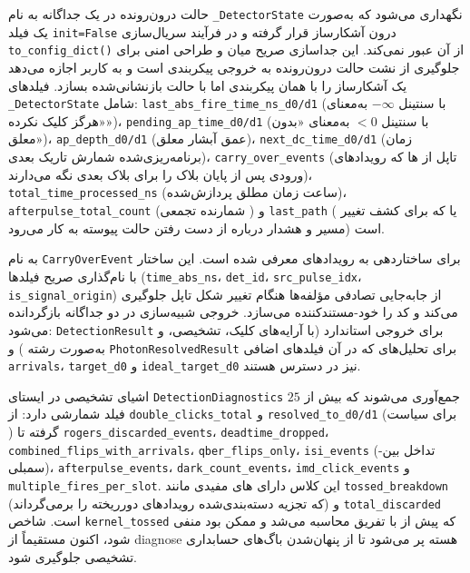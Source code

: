 حالت درون‌رونده در یک  جداگانه به نام \texttt{\_DetectorState} نگهداری می‌شود که به‌صورت یک فیلد \texttt{init=False} درون آشکارساز قرار گرفته و در فرآیند سریال‌سازی \texttt{to\_config\_dict()} از آن عبور نمی‌کند. این جداسازی صریح میان  و  طراحی امنی برای جلوگیری از نشت حالت درون‌رونده به خروجی پیکربندی است و به کاربر اجازه می‌دهد یک آشکارساز را با همان پیکربندی اما با حالت بازنشانی‌شده بسازد. فیلدهای \texttt{\_DetectorState} شامل: \texttt{last\_abs\_fire\_time\_ns\_d0/d1} (با سنتینل $-\infty$ به‌معنای «هرگز کلیک نکرده»)، \texttt{pending\_ap\_time\_d0/d1} (با سنتینل $<0$ به‌معنای «بدون  معلق»)، \texttt{ap\_depth\_d0/d1} (عمق آبشار  معلق)، \texttt{next\_dc\_time\_d0/d1} (زمان برنامه‌ریزی‌شده شمارش تاریک بعدی)، \texttt{carry\_over\_events} (تاپل از ها که رویدادهای ورودی پس از پایان بلاک را برای بلاک بعدی نگه می‌دارند)، \texttt{total\_time\_processed\_ns} (ساعت زمان مطلق پردازش‌شده)، \texttt{afterpulse\_total\_count} (شمارنده تجمعی ) و \texttt{last\_path} ( یا  که برای کشف تغییر مسیر و هشدار درباره از دست رفتن حالت پیوسته به کار می‌رود) است.

 به نام \texttt{CarryOverEvent} برای ساختاردهی به رویدادهای  معرفی شده است. این ساختار با نام‌گذاری صریح فیلدها (\texttt{time\_abs\_ns}، \texttt{det\_id}، \texttt{src\_pulse\_idx}، \texttt{is\_signal\_origin}) از جابه‌جایی تصادفی مؤلفه‌ها هنگام تغییر شکل تاپل جلوگیری می‌کند و کد را خود-مستندکننده می‌سازد. خروجی شبیه‌سازی در دو  جداگانه بازگردانده می‌شود: \texttt{DetectionResult} برای خروجی استاندارد (با آرایه‌های کلیک، تشخیصی، و  به‌صورت رشته ) و \texttt{PhotonResolvedResult} برای تحلیل‌های  که در آن فیلدهای اضافی \texttt{arrivals}، \texttt{target\_d0} و \texttt{ideal\_target\_d0} نیز در دسترس هستند.

اشیای تشخیصی در  ایستای \texttt{DetectionDiagnostics} جمع‌آوری می‌شوند که بیش از $25$ فیلد شمارشی دارد: از \texttt{double\_clicks\_total} و \texttt{resolved\_to\_d0/d1} (برای سیاست ) گرفته تا \texttt{rogers\_discarded\_events}، \texttt{deadtime\_dropped}، \texttt{combined\_flips\_with\_arrivals}، \texttt{qber\_flips\_only}، \texttt{isi\_events} (تداخل بین-سمبلی)، \texttt{afterpulse\_events}، \texttt{dark\_count\_events}، \texttt{imd\_click\_events} و \texttt{multiple\_fires\_per\_slot}. این کلاس دارای های مفیدی مانند \texttt{tossed\_breakdown} (که تجزیه دسته‌بندی‌شده رویدادهای دورریخته را برمی‌گرداند) و \texttt{total\_discarded} است. شاخص \texttt{kernel\_tossed} که پیش از  با تفریق محاسبه می‌شد و ممکن بود منفی شود، اکنون مستقیماً از diagnose هسته  پر می‌شود تا از پنهان‌شدن باگ‌های حسابداری تشخیصی جلوگیری شود.

